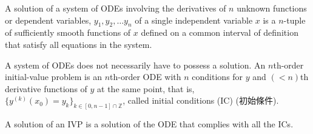 \documentclass[a4paper,12pt]{report}
\begin{document}
{{{{{{{{{{{{{{{{{A solution of a system of ODEs involving the derivatives of $n$ unknown functions or dependent variables, $y_1,y_2,\dots y_n$ of a single independent variable $x$ is a $n$-tuple of sufficiently smooth functions of $x$ defined on a common interval of definition that satisfy all equations in the system.

A system of ODEs does not necessarily have to possess a solution.
An $n$th-order initial-value problem is an $n$th-order ODE with $n$ conditions for $y$ and $(<n)$th derivative functions of $y$ at the same point, that is, $\{y^{(k)}(x_0)=y_k\}_{k\in[0,n-1]\cap\mathbb{Z}}$, called initial conditions (IC) (初始條件).

A solution of an IVP is a solution of the ODE that complies with all the ICs.

}}}}}}}}}}}}}}}}}
\end{document}

